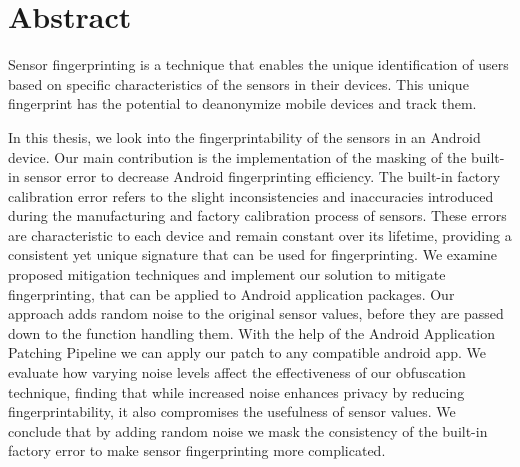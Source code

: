 \documentclass[11pt,
  oneside,openany,    %
]{scrreprt}
\begin{document}









\printthesistitle

\chapter*{Abstract}

Sensor fingerprinting is a technique that enables the unique identification of users based on specific characteristics of the sensors in their devices. 
This unique fingerprint has the potential to deanonymize mobile devices and track them.

In this thesis, we look into the fingerprintability of the sensors in an Android device.
Our main contribution is the implementation of the masking of the built-in sensor error to decrease Android fingerprinting efficiency.
The built-in factory calibration error refers to the slight inconsistencies and inaccuracies introduced during the manufacturing and factory calibration process of sensors. 
These errors are characteristic to each device and remain constant over its lifetime, providing a consistent yet unique signature that can be used for fingerprinting.
We examine proposed mitigation techniques and implement our solution to mitigate fingerprinting, that can be applied to Android application packages.
Our approach adds random noise to the original sensor values, before they are passed down to the function handling them.
With the help of the Android Application Patching Pipeline we can apply our patch to any compatible android app.
We evaluate how varying noise levels affect the effectiveness of our obfuscation technique, finding that while increased noise enhances privacy by reducing fingerprintability, it also compromises the usefulness of sensor values.
We conclude that by adding random noise we mask the consistency of the built-in factory error to make sensor fingerprinting more complicated.
\end{document}
